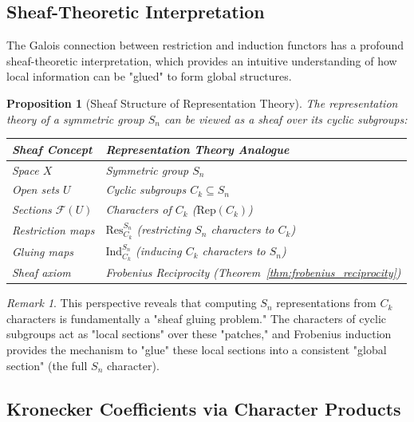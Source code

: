 \documentclass[11pt]{article}
\newtheorem{proposition}[theorem]{Proposition}
\theoremstyle{definition}
\theoremstyle{remark}
\newtheorem{remark}[theorem]{Remark}
\begin{document}
\subsection{Sheaf-Theoretic Interpretation}

The Galois connection between restriction and induction functors has a profound sheaf-theoretic interpretation, which provides an intuitive understanding of how local information can be "glued" to form global structures.

\begin{proposition}[Sheaf Structure of Representation Theory]\label{prop:sheaf_structure}
The representation theory of a symmetric group $S_n$ can be viewed as a sheaf over its cyclic subgroups:
\begin{center}
\begin{tabular}{ll}
\toprule
\textbf{Sheaf Concept} & \textbf{Representation Theory Analogue} \\
\midrule
Space $X$ & Symmetric group $S_n$ \\
Open sets $U$ & Cyclic subgroups $C_k \subseteq S_n$ \\
Sections $\mathcal{F}(U)$ & Characters of $C_k$ ($\text{Rep}(C_k)$) \\
Restriction maps & $\text{Res}^{S_n}_{C_k}$ (restricting $S_n$ characters to $C_k$) \\
Gluing maps & $\text{Ind}_{C_k}^{S_n}$ (inducing $C_k$ characters to $S_n$) \\
Sheaf axiom & Frobenius Reciprocity (Theorem~\ref{thm:frobenius_reciprocity}) \\
\bottomrule
\end{tabular}
\end{center}
\end{proposition}
\begin{remark}
This perspective reveals that computing $S_n$ representations from $C_k$ characters is fundamentally a "sheaf gluing problem." The characters of cyclic subgroups act as "local sections" over these "patches," and Frobenius induction provides the mechanism to "glue" these local sections into a consistent "global section" (the full $S_n$ character).
\end{remark}

\subsection{Kronecker Coefficients via Character Products}
\end{document}
